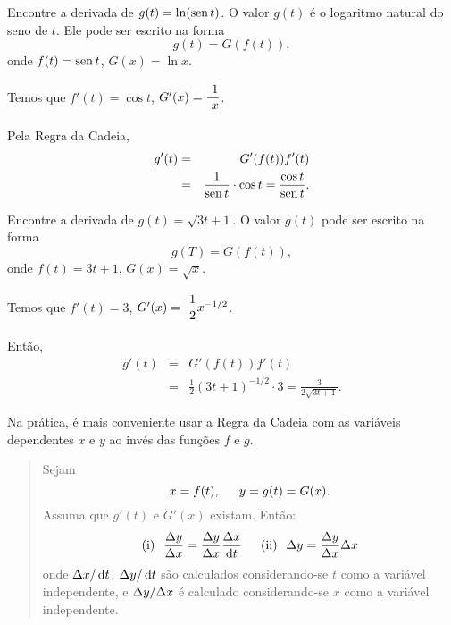 \begin{example}\label{ex:cap2chainrule1}
Encontre a derivada de $g(t) = \ln(\operatorname{sen} t)$. O valor $g(t)$
é o logaritmo natural do seno de $t$. Ele pode ser escrito na forma
$$
  g(t) = G(f(t)),
$$
onde \hspace{1.5em} $f(t) = \operatorname{sen} t$, \hspace{1.5em} $G(x) = \ln x$.

Temos que \hspace{1.5em} $f'(t) = \cos t$, \hspace{1.5em} $G'(x) = \dsfrac{1}{x}$.

Pela Regra da Cadeia,
\begin{eqnarray*}
  g'(t) & = & G'(f(t)) f'(t) \\
  & = & \frac{1}{\operatorname{sen} t} \cdot \cos t = \frac{\cos t}{\operatorname{sen} t}.
\end{eqnarray*}
\end{example}

\begin{example}\label{ex:cap2chainrule2}
Encontre a derivada de $g(t) = \sqrt{3 t + 1}$. O valor
$g(t)$ pode ser escrito na forma
$$
  g(T) = G(f(t)),
$$
onde \hspace{1.5em} $f(t) = 3t + 1$, \hspace{1.5em} $G(x) = \sqrt{x}$.

Temos que \hspace{1.5em} $f'(t) = 3$, \hspace{1.5em} $G'(x) = \dsfrac{1}{2}x^{-1/2}$.

Então,
\begin{eqnarray*}
  g'(t) & = & G'(f(t)) f'(t) \\
  & = & \frac{1}{2}(3t+1)^{-1/2} \cdot 3 = \frac{3}{2\sqrt{3t+1}}.
\end{eqnarray*}
\end{example}

Na prática, é mais conveniente usar a Regra da Cadeia com as variáveis
dependentes $x$ e $y$ ao invés das funções $f$ e $g$.


\begin{quote}
  Sejam
  $$
    x = f(t), \hspace{1.5em} y = g(t) = G(x).
  $$
  Assuma que $g'(t)$ e $G'(x)$ existam. Então:
  $$
    \text{(i)} \hspace{0.7em} \frac{\dy}{\dx} = \frac{\dy}{\dx}\frac{\dx}{\dif t}
    \hspace{1.5em}
    \text{(ii)} \hspace{0.7em} \dy = \frac{\dy}{\dx} \dx
  $$
  onde $\dx/\dif t$, $\dy/\dif t$ são calculados considerando-se $t$ como a
  variável independente, e $\Delta{y}/\Delta{x}$ é calculado considerando-se $x$ como a
  variável independente.
\end{quote}


